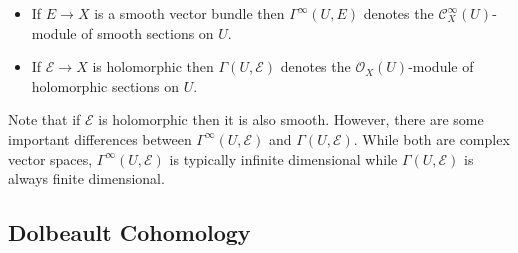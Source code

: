 \documentclass[12pt]{ociamthesis}  %
\begin{document}
\begin{itemize}
  \item If $E\to X$ is a smooth vector bundle then $\Gamma^\infty(U,E)$
        denotes the $\mathscr C^\infty_X(U)$-module of smooth sections on $U$.
  \item If $\mathcal E\to X$ is holomorphic then $\Gamma(U,\mathcal E)$
        denotes the $\mathscr O_X(U)$-module of holomorphic sections
        on $U$.
\end{itemize}

Note that if $\mathcal E$ is holomorphic then it is also smooth.
However, there are some important differences between
$\Gamma^\infty(U,\mathcal E)$ and $\Gamma(U,\mathcal E)$. While both are
complex vector spaces, $\Gamma^\infty(U,\mathcal E)$ is typically infinite
dimensional while $\Gamma(U,\mathcal E)$ is always finite
dimensional.~\cite[Theorem 1.4.1]{ma2007}

\subsection{Dolbeault Cohomology}
\end{document}
